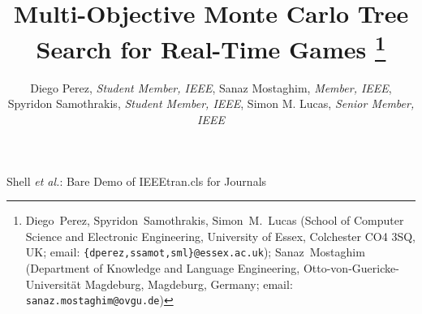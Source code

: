 \documentclass[journal]{IEEEtran}
\begin{document}
%


\title{\ \\ \LARGE\bf Multi-Objective Monte Carlo Tree Search for Real-Time Games \thanks{Diego~Perez, Spyridon~Samothrakis, Simon~M.~Lucas (School of Computer Science and Electronic Engineering, University of Essex, Colchester CO4 3SQ, UK; email: {\tt \{dperez,ssamot,sml\}@essex.ac.uk}); \newline
Sanaz~Mostaghim (Department of Knowledge and Language Engineering, Otto-von-Guericke-Universität Magdeburg, Magdeburg, Germany; email: {\tt sanaz.mostaghim@ovgu.de})}}

%
%
%

\author{Diego Perez, {\it Student Member, IEEE}, Sanaz Mostaghim, {\it Member, IEEE}, Spyridon Samothrakis, {\it Student Member, IEEE}, Simon M. Lucas, {\it Senior Member, IEEE}}

% 
%



%
{Shell \MakeLowercase{\textit{et al.}}: Bare Demo of IEEEtran.cls for Journals}
\end{document}
